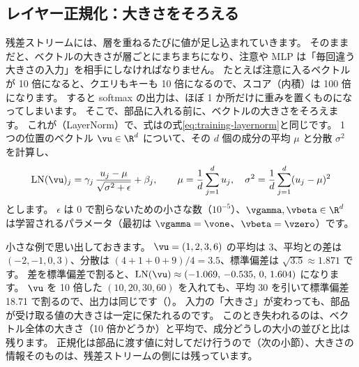 \subsection*{レイヤー正規化：大きさをそろえる}

残差ストリームには、層を重ねるたびに値が足し込まれていきます。
そのままだと、ベクトルの大きさが層ごとにまちまちになり、注意や MLP は「毎回違う大きさの入力」を相手にしなければなりません。
たとえば注意に入るベクトルが 10 倍になると、クエリもキーも 10 倍になるので、スコア（内積）は 100 倍になります。
すると softmax の出力は、ほぼ 1 か所だけに重みを置くものになってしまいます。
そこで、部品に入れる前に、ベクトルの大きさをそろえます。
これが（LayerNorm）\cite{ba2016layer}で、式はの式\eqref{eq:training-layernorm}と同じです。
1 つの位置のベクトル $\vu\in\R^d$ について、その $d$ 個の成分の平均 $\mu$ と分散 $\sigma^2$ を計算し、
\begin{equation}
\mathrm{LN}(\vu)_j = \gamma_j\,\frac{u_j-\mu}{\sqrt{\sigma^2+\epsilon}} + \beta_j,
\qquad \mu=\frac1d\sum_{j=1}^d u_j,\quad \sigma^2=\frac1d\sum_{j=1}^d (u_j-\mu)^2
\label{eq:tf-layernorm}
\end{equation}
とします。
$\epsilon$ は 0 で割らないための小さな数（$10^{-5}$）、$\vgamma,\vbeta\in\R^d$ は学習されるパラメータ（最初は $\vgamma=\vone$、$\vbeta=\vzero$）です。

小さな例で思い出しておきます。
$\vu=(1,2,3,6)$ の平均は 3、平均との差は $(-2,-1,0,3)$、分散は $(4+1+0+9)/4=3.5$、標準偏差は $\sqrt{3.5}\approx1.871$ です。
差を標準偏差で割ると、$\mathrm{LN}(\vu)\approx(-1.069,\,-0.535,\,0,\,1.604)$ になります。
$\vu$ を 10 倍した $(10,20,30,60)$ を入れても、平均 30 を引いて標準偏差 18.71 で割るので、出力は同じです（）。
入力の「大きさ」が変わっても、部品が受け取る値の大きさは一定に保たれるのです。
このとき失われるのは、ベクトル全体の大きさ（10 倍かどうか）と平均で、成分どうしの大小の並びと比は残ります。
正規化は部品に渡す値に対してだけ行うので（次の小節）、大きさの情報そのものは、残差ストリームの側には残っています。

